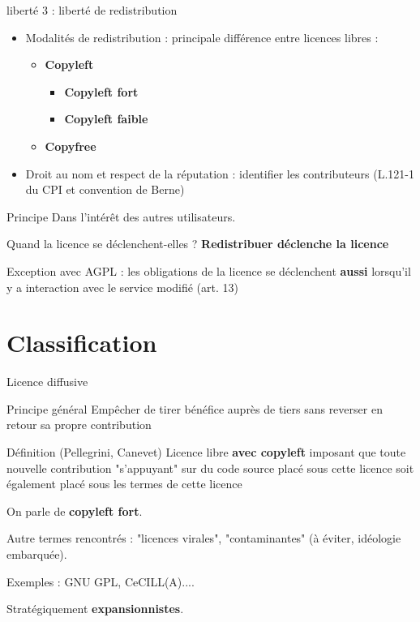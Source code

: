 \documentclass{beamer}
\begin{document}
\begin{frame}{liberté 3 : liberté de redistribution}
  \begin{itemize}
  \item Modalités de redistribution : principale différence entre licences libres :
    \begin{itemize}
    \item \textbf{Copyleft}
    \begin{itemize}
    	\item \textbf{Copyleft fort}
  	    \item \textbf{Copyleft faible}
  	\end{itemize}
    \item \textbf{Copyfree}
    \end{itemize}

  \item Droit au nom et respect de la réputation : identifier les contributeurs (L.121-1 du CPI et convention de Berne)
   \end{itemize}
\begin{alertblock}{Principe}
    Dans l'intérêt des autres utilisateurs.
  \end{alertblock}

\begin{alertblock}{Quand la licence se déclenchent-elles ?}
\textbf{Redistribuer déclenche la licence}
 \end{alertblock}
 
Exception avec AGPL : les obligations de la licence se déclenchent \textbf{aussi} lorsqu'il y a interaction avec le service modifié (art. 13)
\end{frame}




\section{Classification}


\begin{frame}{Licence diffusive}

  \begin{block}{Principe général}
    Empêcher de tirer bénéfice auprès de tiers sans reverser en retour sa propre contribution    
  \end{block}

  \begin{alertblock}{Définition (Pellegrini, Canevet)}
    Licence libre \textbf{avec copyleft} imposant que toute nouvelle contribution "s'appuyant" sur du code source placé sous cette licence soit également placé sous les termes de cette licence
   \end{alertblock}

On parle de \textbf{copyleft fort}.

Autre termes rencontrés : "licences virales", "contaminantes" (à éviter, idéologie embarquée).
  
Exemples : GNU GPL, CeCILL(A)....

Stratégiquement \textbf{expansionnistes}.
\end{frame}
\end{document}

